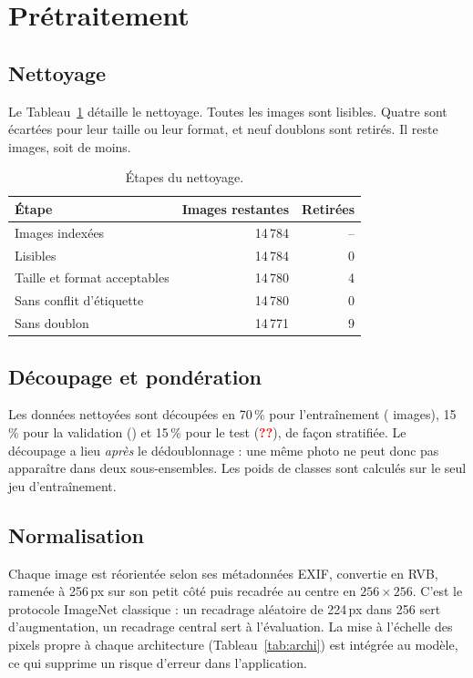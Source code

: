 \documentclass[conference]{IEEEtran}
\newcommand{\todo}{\textcolor{red}{\textbf{??}}}
\newcommand{\nTest}{\todo}\newcommand{\knnBaseline}{\todo}\newcommand{\bestModel}{\todo}
\begin{document}
\section{Prétraitement}\label{sec:pre}
\subsection{Nettoyage}
Le Tableau~\ref{tab:clean} détaille le nettoyage. Toutes les images sont lisibles. Quatre sont écartées pour leur taille ou leur format, et neuf doublons sont retirés. Il reste \nClean{} images, soit \nRemoved{} de moins.

\begin{table}[!htb]
\caption{Étapes du nettoyage.}
\label{tab:clean}
\centering\scriptsize\setlength{\tabcolsep}{4pt}
\begin{tabular}{@{}lrr@{}}
\toprule
Étape & Images restantes & Retirées\\
\midrule
Images indexées & 14\,784 & --\\
Lisibles & 14\,784 & 0\\
Taille et format acceptables & 14\,780 & 4\\
Sans conflit d'étiquette & 14\,780 & 0\\
Sans doublon & 14\,771 & 9\\
\bottomrule
\end{tabular}
\end{table}

\subsection{Découpage et pondération}
Les données nettoyées sont découpées en 70\,\% pour l'entraînement (\nTrain{} images), 15\,\% pour la validation (\nVal{}) et 15\,\% pour le test (\nTest{}), de façon stratifiée. Le découpage a lieu \emph{après} le dédoublonnage : une même photo ne peut donc pas apparaître dans deux sous-ensembles. Les poids de classes sont calculés sur le seul jeu d'entraînement.

\subsection{Normalisation}
Chaque image est réorientée selon ses métadonnées EXIF, convertie en RVB, ramenée à 256\,px sur son petit côté puis recadrée au centre en $256{\times}256$. C'est le protocole ImageNet classique : un recadrage aléatoire de 224\,px dans 256 sert d'augmentation, un recadrage central sert à l'évaluation. La mise à l'échelle des pixels propre à chaque architecture (Tableau~\ref{tab:archi}) est intégrée au modèle, ce qui supprime un risque d'erreur dans l'application.
\end{document}
